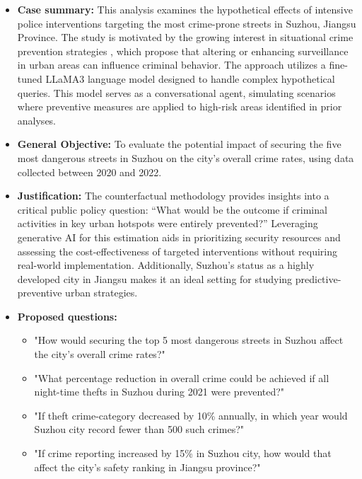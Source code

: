 \begin{itemize}
    \item \textbf{Case summary:} This analysis examines the hypothetical effects of intensive police interventions targeting the most crime-prone streets in Suzhou, Jiangsu Province. The study is motivated by the growing interest in situational crime prevention strategies \cite{clarke1995situational}, which propose that altering or enhancing surveillance in urban areas can influence criminal behavior. 
        The approach utilizes a fine-tuned LLaMA3 language model designed to handle complex hypothetical queries. This model serves as a conversational agent, simulating scenarios where preventive measures are applied to high-risk areas identified in prior analyses.
        \item \textbf{General Objective:} To evaluate the potential impact of securing the five most dangerous streets in Suzhou on the city’s overall crime rates, using data collected between 2020 and 2022.
        \item \textbf{Justification:} The counterfactual methodology provides insights into a critical public policy question: “What would be the outcome if criminal activities in key urban hotspots were entirely prevented?” Leveraging generative AI for this estimation aids in prioritizing security resources and assessing the cost-effectiveness of targeted interventions without requiring real-world implementation. Additionally, Suzhou’s status as a highly developed city in Jiangsu makes it an ideal setting for studying predictive-preventive urban strategies.
        \item \textbf{Proposed questions:}
        \begin{itemize}
            \item "How would securing the top 5 most dangerous streets in Suzhou affect the city’s overall crime rates?"
            \item "What percentage reduction in overall crime could be achieved if all night-time thefts in Suzhou during 2021 were prevented?"
            \item "If theft crime-category decreased by 10\% annually, in which year would Suzhou city record fewer than 500 such crimes?"
            \item "If crime reporting increased by 15\% in Suzhou city, how would that affect the city's safety ranking in Jiangsu province?"
        \end{itemize}




\end{itemize}


